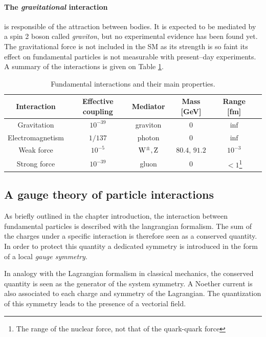 \paragraph{The \emph{gravitational} interaction} is responsible of the attraction between bodies. It is expected to be mediated by a spin 2 boson called \emph{graviton}, but no experimental evidence has been found yet. The gravitational force is not included in the SM as its strength is so faint its effect on fundamental particles is not measurable with present--day experiments. %
A summary of the interactions is given on Table \ref{tab:bosons}.

\begin{table}
\caption{Fundamental interactions and their main properties.}
\label{tab:bosons}
\begin{center}
\begin{tabular}{ c c c c c c}
\hline
Interaction & Effective coupling & Mediator & Mass [GeV] & Range [fm]\\
\hline
Gravitation & $10^{-39}$ & graviton & 0 & $\inf$ \\
Electromagnetism & $1/137$ & photon & 0 & $\inf$ \\
Weak force & $10^{-5}$ & $\mathrm{W}^\pm,\mathrm{Z}$ & $80.4,\,91.2$ & $10^{-3}$ \\
Strong force & $10^{-39}$ & gluon & 0 & $<1$\footnote{The range of the nuclear force, not that of the quark-quark force} \\
\hline
\end{tabular}
\end{center}
\end{table}

\subsection{A gauge theory of particle interactions}

As briefly outlined in the chapter introduction, the interaction between fundamental particles is described with the langrangian formalism. The sum of the charges under a specific interaction is therefore seen as a conserved quantity. In order to protect this quantity a dedicated symmetry is introduced in the form of a local \emph{gauge symmetry}. 

In analogy with the Lagrangian formalism in classical mechanics, the conserved quantity is seen as the generator of the system symmetry. A Noether current is also associated to each charge and symmetry of the Lagrangian. The quantization of this symmetry leads to the presence of a vectorial field. 

